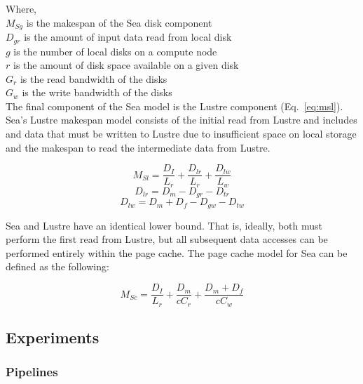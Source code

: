       
      Where, \\
      $M_{Sg}$ is the makespan of the Sea disk component \\
      $D_{gr}$ is the amount of input data read from local disk \\
      $g$ is the number of local disks on a compute node \\
      $r$ is the amount of disk space available on a given disk \\
      $G_{r}$ is the read bandwidth of the disks \\
      $G_{w}$ is the write bandwidth of the disks \\

      The final component of the Sea model is the Lustre component
      (Eq.~\ref{eq:msl}). Sea's Lustre makespan model consists of the initial
      read from Lustre and includes and data that must be written to Lustre due
      to insufficient space on local storage and the makespan to read the
      intermediate data from Lustre.

      \begin{equation}\label{eq:msl}
          M_{Sl} = \frac{D_{I}}{L_{r}} + \frac{D_{lr}}{L_{r}} + \frac{D_{lw}}{L_{w}}
      \end{equation}
      \begin{equation*}\label{eq:dlr}
          D_{lr} = D_{m} - D_{gr} - D_{tr}
      \end{equation*}
      \begin{equation*}\label{eq:dlw}
          D_{lw} = D_{m} + D_{f} - D_{gw} - D_{tw}
      \end{equation*}

      Sea and Lustre have an identical lower bound. That is, ideally, both must
      perform the first read from Lustre, but all subsequent data accesses can
      be performed entirely within the page cache. The page cache model for Sea
      can be defined as the following:

      \begin{equation}\label{eq:msc}
          M_{Sc} = \frac{D_{I}}{L_{r}} + \frac{D_{m}}{cC_{r}} + \frac{D_{m} + D_{f}}{cC_{w}}
      \end{equation}
\subsection{Experiments}
\subsubsection{Pipelines}

